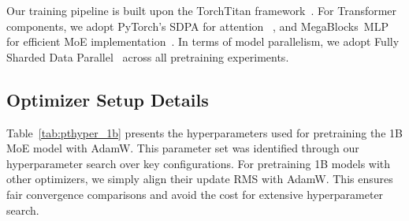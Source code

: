 \documentclass[11pt]{article}
\begin{document}
Our training pipeline is built upon the TorchTitan framework~\citep{torchtitan}.
For Transformer components, we adopt PyTorch’s SDPA for attention ~\citep{pytorch},
and MegaBlocks~\(\mathrm{MLP}\) for efficient MoE implementation~\citep{megablocks}.
In terms of model parallelism, we adopt Fully Sharded Data Parallel~\citep{fsdp} across all pretraining experiments.

\begin{table}[h]
  \centering
  \small
  \caption{Hyperparameters of model architectures.}
  \label{tab:mdhyper}
\end{table}

\subsection{Optimizer Setup Details}
Table~\ref{tab:pthyper_1b} presents the hyperparameters used for pretraining the 1B MoE model with AdamW.
This parameter set was identified through our hyperparameter search over key configurations.
For pretraining 1B models with other optimizers, we simply align their update RMS with AdamW. 
This ensures fair convergence comparisons and avoid the cost for extensive hyperparameter search.
\end{document}
